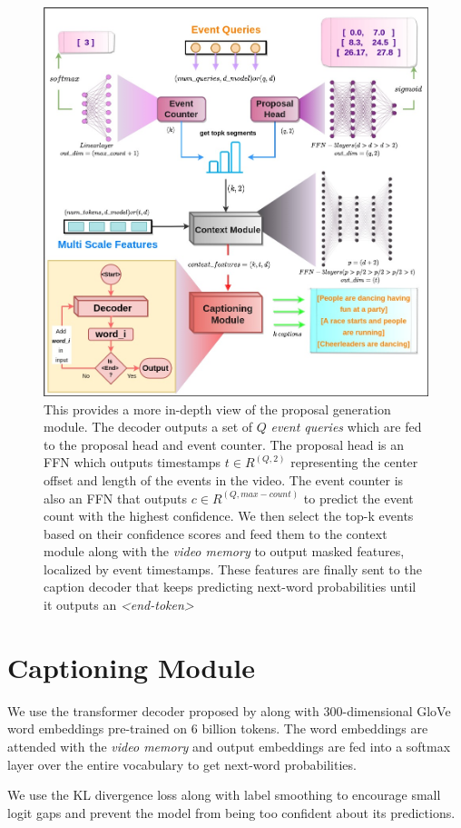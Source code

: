 \begin{figure} [H]
	\centering
	\includegraphics[width=\linewidth]{assets/img/architecture-2.jpeg}
	\caption{This provides a more in-depth view of the proposal generation module. The decoder outputs a set of $Q$ \textit{event queries} which are fed to the proposal head and event counter. The proposal head is an FFN which outputs timestamps $t \in R^{(Q, 2)}$ representing the center offset and length of the events in the video. The event counter is also an FFN that outputs $c \in R^{(Q, max-count)}$ to predict the event count with the highest confidence. We then select the top-k events based on their confidence scores and feed them to the context module along with the \textit{video memory} to output masked features, localized by event timestamps. These features are finally sent to the caption decoder that keeps predicting next-word probabilities until it outputs an \textit{<end-token>}}
\end{figure}


\section{Captioning Module}
\par We use the transformer decoder proposed by \cite{tfm} along with 300-dimensional GloVe word embeddings pre-trained on 6 billion tokens\cite{glove}. The word embeddings are attended with the \textit{video memory} and output embeddings are fed into a softmax layer over the entire vocabulary to get next-word probabilities.
\par We use the KL divergence loss along with label smoothing to encourage small logit gaps and prevent the model from being too confident about its predictions.

